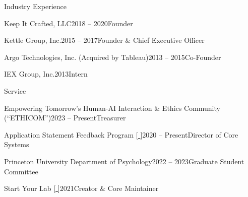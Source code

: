 \documentclass{cv} %
\begin{document}

\begin{cvSection}{Industry Experience}

  \begin{cvSubsectionWork}{Keep It Crafted, LLC}{2018 -- 2020}{Founder}
  \end{cvSubsectionWork}

  \begin{cvSubsectionWork}{Kettle Group, Inc.}{2015 -- 2017}{Founder \& Chief Executive Officer}
  \end{cvSubsectionWork}

  \begin{cvSubsectionWork}{Argo Technologies, Inc. (Acquired by Tableau)}{2013 -- 2015}{Co-Founder}
  \end{cvSubsectionWork}

  \begin{cvSubsectionWork}{IEX Group, Inc.}{2013}{Intern}
  \end{cvSubsectionWork}

\end{cvSection}


\begin{cvSection}{Service}

  \begin{cvSubsectionWork}{Empowering Tomorrow's Human-AI Interaction \& Ethics Community (``ETHICOM'')}{2023 -- Present}{Treasurer}
  \end{cvSubsectionWork}

  \begin{cvSubsectionWork}{Application Statement Feedback Program [\href{https://www.asfp.io/}{ }]}{2020 -- Present}{Director of Core Systems}
  \end{cvSubsectionWork}

  \begin{cvSubsectionWork}{Princeton University Department of Psychology}{2022 -- 2023}{Graduate Student Committee}
  \end{cvSubsectionWork}

  \begin{cvSubsectionWork}{Start Your Lab [\href{https://www.startyourlab.com/}{ }]}{2021}{Creator \& Core Maintainer}
  \end{cvSubsectionWork}

\end{cvSection}
\end{document}
